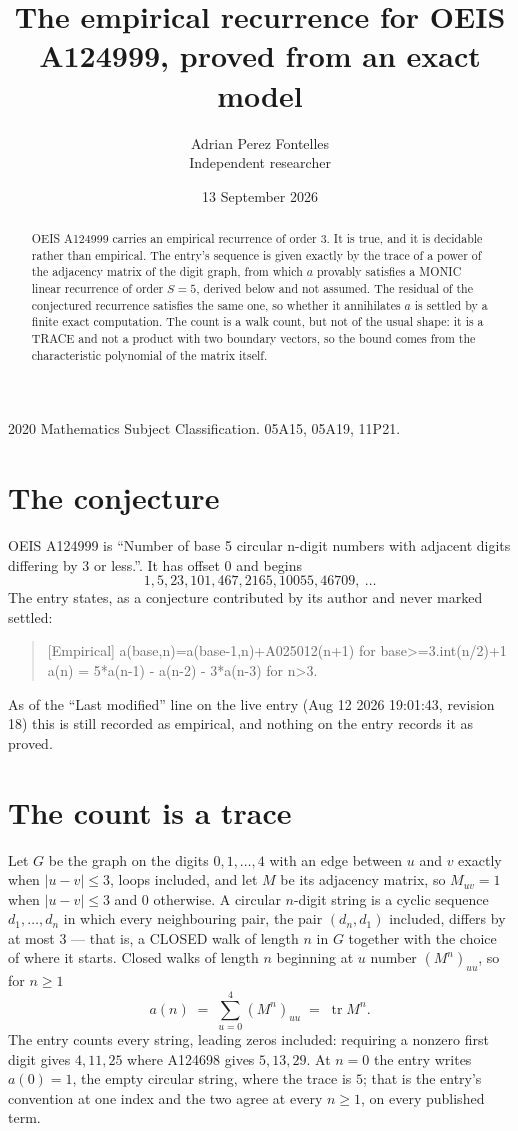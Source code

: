 \documentclass[11pt,a4paper]{article}
\title{The empirical recurrence for OEIS A124999, proved from an exact model}
\author{Adrian Perez Fontelles\\ \small Independent researcher}
\date{13 September 2026}
\theoremstyle{plain}
\theoremstyle{definition}
\begin{document}
\maketitle

\begin{abstract}
OEIS A124999 carries an empirical recurrence of order $3$. It is true, and it is
decidable rather than empirical. The entry's sequence is given exactly by the trace of a power of the adjacency matrix of the digit graph, from
which $a$ provably satisfies a MONIC linear recurrence of order $S=5$, derived below and not
assumed. The residual of the conjectured recurrence satisfies the same one, so whether it
annihilates $a$ is settled by a finite exact computation. The count is a walk count, but not of the usual shape: it is a TRACE and not a product with two boundary vectors, so the bound comes from the characteristic polynomial of the matrix itself.
\end{abstract}

\noindent\small 2020 Mathematics Subject Classification. 05A15, 05A19, 11P21.\normalsize

\section{The conjecture}

OEIS A124999 is ``Number of base 5 circular n-digit numbers with adjacent digits differing by 3 or less.''. It has offset $0$ and begins
\[
1, 5, 23, 101, 467, 2165, 10055, 46709,\ \dots
\]
The entry states, as a conjecture contributed by its author and never marked settled:
\begin{quote}
[Empirical] a(base,n)=a(base-1,n)+A025012(n+1) for base>=3.int(n/2)+1 a(n) = 5*a(n-1) - a(n-2) - 3*a(n-3) for n>3.
\end{quote}
As of the ``Last modified'' line on the live entry (Aug 12 2026 19:01:43, revision 18)
this is still recorded as empirical, and nothing on the entry records it as proved.

\section{The count is a trace}

Let $G$ be the graph on the digits $0,1,\dots,4$ with an edge between $u$ and $v$ exactly
when $|u-v|\le3$, loops included, and let $M$ be its adjacency matrix, so $M_{uv}=1$ when
$|u-v|\le3$ and $0$ otherwise. A circular $n$-digit string is a cyclic sequence
$d_1,\dots,d_n$ in which every neighbouring pair, the pair $(d_n,d_1)$ included, differs by at
most $3$ --- that is, a CLOSED walk of length $n$ in $G$ together with the choice of where it
starts. Closed walks of length $n$ beginning at $u$ number $(M^n)_{uu}$, so for $n\ge1$
\[
a(n)\;=\;\sum_{u=0}^{4}(M^{n})_{uu}\;=\;\operatorname{tr}M^{n} .
\]
The entry counts every string, leading zeros included: requiring a nonzero first digit gives
$4,11,25$ where A124698 gives $5,13,29$. At $n=0$ the entry writes $a(0)=1$, the empty circular
string, where the trace is $5$; that is the entry's convention at one index and the two agree
at every $n\ge1$, on every published term.
\end{document}
